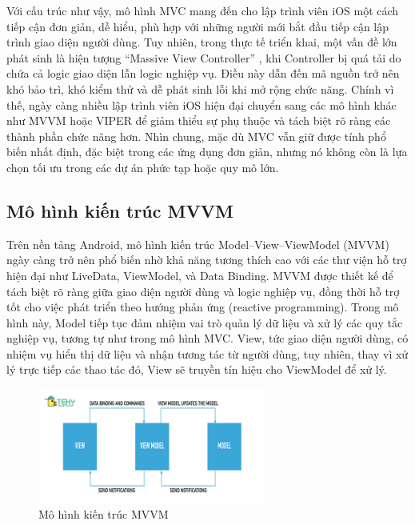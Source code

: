     \begin{flushleft}
      \hspace*{0.8cm}Với cấu trúc như vậy, mô hình MVC mang đến cho lập trình viên iOS một cách tiếp cận đơn giản, dễ hiểu, phù hợp với những người mới bắt đầu tiếp cận lập trình giao diện người dùng. Tuy nhiên, trong thực tế triển khai, một vấn đề lớn phát sinh là hiện tượng “Massive View Controller” \cite{massive_vc}, khi Controller bị quá tải do chứa cả logic giao diện lẫn logic nghiệp vụ. Điều này dẫn đến mã nguồn trở nên khó bảo trì, khó kiểm thử và dễ phát sinh lỗi khi mở rộng chức năng. Chính vì thế, ngày càng nhiều lập trình viên iOS hiện đại chuyển sang các mô hình khác như MVVM hoặc VIPER để giảm thiểu sự phụ thuộc và tách biệt rõ ràng các thành phần chức năng hơn. Nhìn chung, mặc dù MVC vẫn giữ được tính phổ biến nhất định, đặc biệt trong các ứng dụng đơn giản, nhưng nó không còn là lựa chọn tối ưu trong các dự án phức tạp hoặc quy mô lớn.
    \end{flushleft}

\subsection{Mô hình kiến trúc MVVM}
\renewcommand{\labelitemi}{--}    
    \begin{flushleft}
        \hspace*{0.8cm}Trên nền tảng Android, mô hình kiến trúc Model–View–ViewModel (MVVM) ngày càng trở nên phổ biến nhờ khả năng tương thích cao với các thư viện hỗ trợ hiện đại như LiveData, ViewModel, và Data Binding. MVVM được thiết kế để tách biệt rõ ràng giữa giao diện người dùng và logic nghiệp vụ, đồng thời hỗ trợ tốt cho việc phát triển theo hướng phản ứng (reactive programming). Trong mô hình này, Model tiếp tục đảm nhiệm vai trò quản lý dữ liệu và xử lý các quy tắc nghiệp vụ, tương tự như trong mô hình MVC. View, tức giao diện người dùng, có nhiệm vụ hiển thị dữ liệu và nhận tương tác từ người dùng, tuy nhiên, thay vì xử lý trực tiếp các thao tác đó, View sẽ truyền tín hiệu cho ViewModel để xử lý.
    \end{flushleft}

\begin{figure}[H]
    \centering
    \includegraphics[width=0.67\textwidth]{images/mvvm.jpg}
    \caption{Mô hình kiến trúc MVVM}
    \label{fig:fig13}
  \end{figure}

